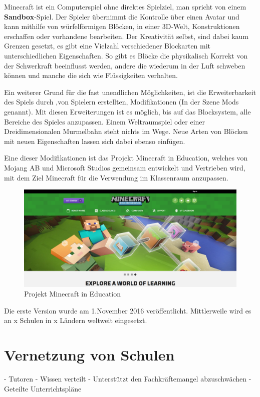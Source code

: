 Minecraft ist ein Computerspiel ohne direktes Spielziel, man spricht von einem \textbf{Sandbox}-Spiel.
Der Spieler übernimmt die Kontrolle über einen Avatar und kann mithilfe von würfelförmigen Blöcken,
in einer 3D-Welt, Konstruktionen erschaffen oder vorhandene bearbeiten. Der Kreativität selbst,
sind dabei kaum Grenzen gesetzt, es gibt eine Vielzahl verschiedener Blockarten mit unterschiedlichen
Eigenschaften. So gibt es Blöcke die physikalisch Korrekt von der Schwerkraft beeinflusst werden,
andere die wiederum in der Luft schweben können und manche die sich wie Flüssigkeiten verhalten.
\cite{WikiMinecraft}

Ein weiterer Grund für die fast unendlichen Möglichkeiten, ist die Erweiterbarkeit des Spiels durch
,von Spielern erstellten, Modifikationen (In der Szene Mods genannt). Mit diesen Erweiterungen ist es
möglich, bis auf das Blocksystem, alle Bereiche des Spieles anzupassen. Einem Weltraumspiel oder einer
Dreidimensionalen Murmelbahn steht nichts im Wege. Neue Arten von Blöcken mit neuen Eigenschaften lassen
sich dabei ebenso einfügen. 

Eine dieser Modifikationen ist das Projekt Minecraft in Education, welches
von Mojang AB und Microsoft Studios gemeinsam entwickelt und Vertrieben wird, mit dem Ziel Minecraft für die Verwendung im Klassenraum anzupassen. \cite{GamepediaMinecraft}

\begin{figure}[ht]
	\centering
	\includegraphics[width=\textwidth,height=\textheight,keepaspectratio]{images/Minecraft.png}
	\caption{Projekt Minecraft in Education \cite{HomepageMinecraftEducation}}
	\label{projectMinecraft}
\end{figure}

Die erste Version wurde am 1.November 2016 veröffentlicht. Mittlerweile wird es an x Schulen in x Ländern weltweit eingesetzt.
\section{Vernetzung von Schulen}
- Tutoren
- Wissen verteilt
- Unterstützt den Fachkräftemangel abzuschwächen
- Geteilte Unterrichtspläne
